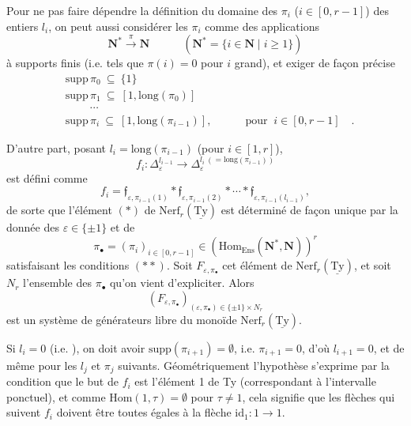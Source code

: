 \documentclass[11pt]{article}
\newcommand{\printedpage}[1]{\marginpar{\footnotesize p.~#1}}
\newcommand{\msp}[1]{\marginpar{\footnotesize [#1]}}
\newcommand{\Ty}{\underline{\mathrm{Ty}}}
\newcommand{\Nerf}{\mathrm{Nerf}}
\begin{document}
\msp{page 57}
Pour ne pas faire dépendre la définition du domaine des $\pi_i$ ($i\in[0,r-1]$) des entiers $l_i$, on peut aussi considérer les $\pi_i$ comme des applications
\[
\mathbf{N}^*\xrightarrow{\ \pi\ }\mathbf{N} \qquad\quad (\mathbf{N}^*=\{i\in\mathbf{N}\mid i\geq 1\})
\]
à supports finis (i.e. tels que $\pi(i)=0$ pour $i$ grand), et exiger de façon précise
\[
\begin{aligned}
&\mathrm{supp}\,\pi_0\ \subseteq\ \{1\}\\
&\mathrm{supp}\,\pi_1\ \subseteq\ [1,\mathrm{long}(\pi_0)]\\
&\qquad\ \cdots\\
&\boxed{\mathrm{supp}\,\pi_i\ \subseteq\ [1,\mathrm{long}(\pi_{i-1})]}, \qquad\quad \text{pour }\ \boxed{i\in[0,r-1]}\quad .
\end{aligned}
\tag*{$(**)$}
\]

\printedpage{39}
D'autre part, posant $l_i = \mathrm{long}(\pi_{i-1})$ (pour $i \in [1,r]$),
\[
f_i : \Delta_\varepsilon^{l_{i-1}} \longrightarrow \Delta_\varepsilon^{l_i\ (=\mathrm{long}(\pi_{i-1}))}
\]
est défini comme
\[
f_i = \mathfrak{f}_{\varepsilon,\pi_{i-1}(1)} * \mathfrak{f}_{\varepsilon,\pi_{i-1}(2)} * \cdots * \mathfrak{f}_{\varepsilon,\pi_{i-1}(l_{i-1})},
\]
de sorte que l'élément $(*)$ de $\Nerf_r(\Ty)$ est déterminé de façon unique par la donnée des $\varepsilon \in \{\pm 1\}$ et de
\[
\pi_\bullet = (\pi_i)_{i\in[0,r-1]} \in (\mathrm{Hom}_{\mathrm{Ens}}(\mathbf{N}^*,\mathbf{N}))^r
\]
satisfaisant les conditions $(**)$. Soit $F_{\varepsilon,\pi_\bullet}$ cet élément de $\Nerf_r(\Ty)$, et soit $N_r$ l'ensemble des $\pi_\bullet$ qu'on vient d'expliciter. Alors
\[
(F_{\varepsilon,\pi_\bullet})_{(\varepsilon,\pi_\bullet)\in\{\pm1\}\times N_r}
\]
est un système de générateurs libre du monoïde $\Nerf_r(\Ty)$.

Si $l_i = 0$ (i.e. ), on doit avoir $\mathrm{supp}(\pi_{i+1}) = \emptyset$, i.e. $\pi_{i+1} = 0$, d'où $l_{i+1} = 0$, et de même pour les $l_j$ et $\pi_j$ suivants. Géométriquement l'hypothèse s'exprime par la condition que le but
\msp{page 58}
de $f_i$ est l'élément 1 de Ty (correspondant à l'intervalle ponctuel), et comme $\mathrm{Hom}(1,\tau) = \emptyset$ pour $\tau \neq 1$, cela signifie que les flèches qui suivent $f_i$ doivent être toutes égales à la flèche $\mathrm{id}_1 : 1 \longrightarrow 1$.
\end{document}
